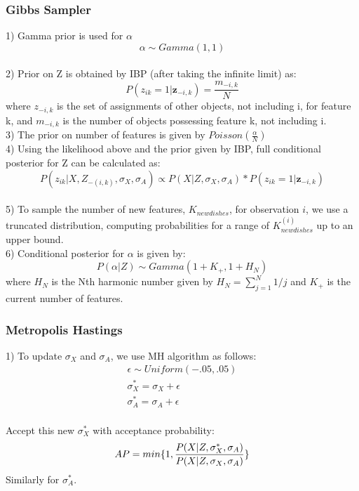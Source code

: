 \documentclass[11pt]{article}
\begin{document}
\subsubsection{Gibbs Sampler}

1) Gamma prior is used for $\alpha$
$$
\alpha \sim Gamma(1,1)
$$\\

2) Prior on Z is obtained by IBP (after taking the infinite limit) as:
$$
P(z_{ik}=1|\textbf{z}_{-i,k}) = \frac{m_{-i,k}}{N}
$$
where ${z}_{-i,k}$ is the set of assignments of other objects, not including i, for feature k, and
${m}_{-i,k}$ is the number of objects possessing feature k, not including i.\\

3) The prior on number of features is given by $Poisson(\frac{\alpha}{N})$\\

4) Using the likelihood above and the prior given by IBP, full conditional posterior for Z can be calculated as:
$$
P(z_{ik}|X,Z_{-(i,k)},\sigma_X,\sigma_A) \propto  P(X|Z,\sigma_X,\sigma_A) * P(z_{ik}=1|\textbf{z}_{-i,k})
$$\\
5) To sample the number of new features, $K_{newdishes}$, for observation $i$, we use a truncated distribution, computing probabilities for a range of $K_{newdishes}^{(i)}$ up to an upper bound.\\

6) Conditional posterior for $\alpha$ is given by:
$$
P(\alpha|Z) \sim Gamma(1+K_+, 1+H_N)
$$
where $H_N$ is the Nth harmonic number given by $H_N=\sum_{j=1}^{N} 1/j$ and $K_{+}$ is the current number of features.

\subsubsection{Metropolis Hastings}

1) To update $\sigma_X$ and $\sigma_A$, we use MH algorithm as follows:
\begin{eqnarray*}
\epsilon \sim Uniform(-.05,.05)\\
\sigma_X^{*} =  \sigma_X +\epsilon\\
\sigma_A^{*} =  \sigma_A +\epsilon\\
\end{eqnarray*}

Accept this new $\sigma_X^{*}$ with acceptance probability:
\begin{equation*}
AP = min\{1,\frac{P(X|Z, \sigma_X^{*}, \sigma_A)}{P(X|Z, \sigma_X,\sigma_A)}\}\\
\end{equation*}
Similarly for $\sigma_A^{*}$.
\end{document}
